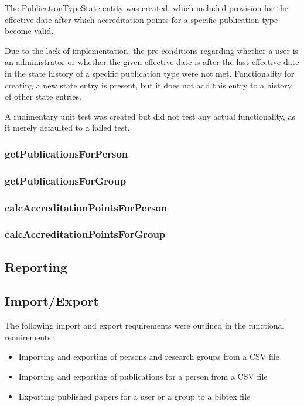\documentclass[a4paper,10pt]{article}
\begin{document}
The PublicationTypeState entity was created, which included provision for the effective date after which accreditation points for a specific publication type become valid.

Due to the lack of implementation, the pre-conditions regarding whether a user is an administrator or whether the given effective date is after the last effective date in the state history of a specific publication type were not met. Functionality for creating a new state entry is present, but it does not add this entry to a history of other state entries.

A rudimentary unit test was created but did not test any actual functionality, as it merely defaulted to a failed test.

\subsubsection{getPublicationsForPerson}

\subsubsection{getPublicationsForGroup}

\subsubsection{calcAccreditationPointsForPerson}

\subsubsection{calcAccreditationPointsForGroup}

\subsection{Reporting}

\subsection{Import/Export}
The following import and export requirements were outlined in the functional requirements:
\begin{itemize}
	\item Importing and exporting of persons and research groups from a CSV file
	\item Importing and exporting of publications for a person from a CSV file
	\item Exporting published papers for a user or a group to a bibtex file
\end{itemize}
\end{document}
